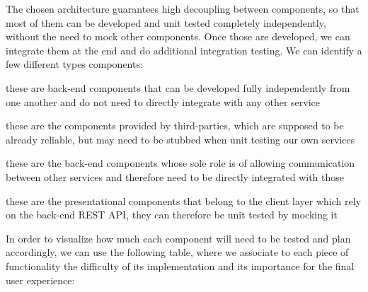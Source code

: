 
The chosen architecture guarantees high decoupling between components, so that most of them
can be developed and unit tested completely independently, without the need to mock other
components. Once those are developed, we can integrate them at the end and do additional
integration testing. We can identify a few different types components:

\begin{description}[leftmargin=0pt]
    \item[Independent components:] these are back-end components that can be developed fully independently
          from one another and do not need to directly integrate with any other service
    \item[External components:] these are the components provided by third-parties, which are supposed
          to be already reliable, but may need to be stubbed when unit testing our own services
    \item[Integrating components:] these are the back-end components whose sole role is of allowing
          communication between other services and therefore need to be directly integrated with those
    \item[Front-end components:] these are the presentational components that belong to the client layer
          which rely on the back-end REST API, they can therefore be unit tested by mocking it
\end{description}

In order to visualize how much each component will need to be tested and plan accordingly, we can use
the following table, where we associate to each piece of functionality the difficulty of its
implementation and its importance for the final user experience:

